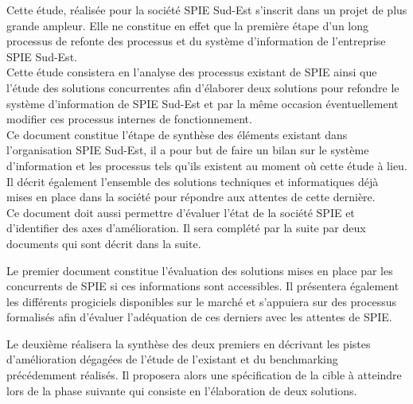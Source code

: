 Cette étude, réalisée pour la société SPIE Sud-Est s'inscrit dans un projet de plus grande ampleur. Elle ne constitue en effet que la première étape d'un long processus de refonte des processus et du système d'information de l'entreprise SPIE Sud-Est. \\

Cette étude consistera en l'analyse des processus existant de SPIE ainsi que l'étude des solutions concurrentes afin d'élaborer deux solutions pour refondre le système d'information de SPIE Sud-Est et par la même occasion éventuellement modifier ces processus internes de fonctionnement. \\

Ce document constitue l'étape de synthèse des éléments existant dans l'organisation SPIE Sud-Est, il a pour but de faire un bilan sur le système d'information et les processus tels qu'ils existent au moment où cette étude à lieu. Il décrit également l'ensemble des solutions techniques et informatiques déjà mises en place dans la société pour répondre aux attentes de cette dernière. \\

Ce document doit aussi permettre d'évaluer l'état de la société SPIE et d'identifier des axes d'amélioration. Il sera complété par la suite par deux documents qui sont décrit dans la suite.

Le premier document constitue l'évaluation des solutions mises en place par les concurrents de SPIE si ces informations sont accessibles. Il présentera également les différents progiciels disponibles sur le marché et s'appuiera sur des processus formalisés afin d'évaluer l'adéquation de ces derniers avec les attentes de SPIE.

Le deuxième réalisera la synthèse des deux premiers en décrivant les pistes d'amélioration dégagées de l'étude de l'existant et du benchmarking précédemment réalisés. Il proposera alors une spécification de la cible à atteindre lors de la phase suivante qui consiste en l'élaboration de deux solutions. 